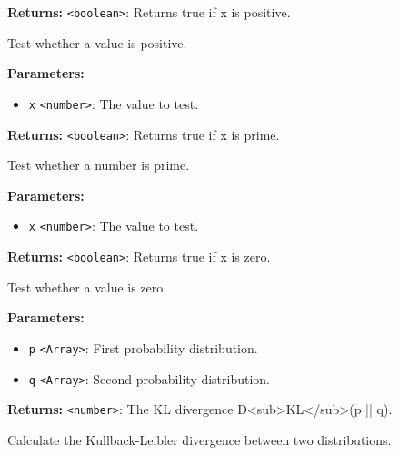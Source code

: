 \documentclass[12pt,a4paper]{article}
\begin{document}
\noindent \textbf{Returns:} \texttt{<boolean>}: Returns true if x is positive.

\noindent Test whether a value is positive.

\vspace{5mm}
\noindent {}


\noindent \textbf{Parameters:}
\begin{itemize}
  \item \texttt{x} \texttt{<number>}: The value to test.
\end{itemize}

\noindent \textbf{Returns:} \texttt{<boolean>}: Returns true if x is prime.

\noindent Test whether a number is prime.

\vspace{5mm}
\noindent {}


\noindent \textbf{Parameters:}
\begin{itemize}
  \item \texttt{x} \texttt{<number>}: The value to test.
\end{itemize}

\noindent \textbf{Returns:} \texttt{<boolean>}: Returns true if x is zero.

\noindent Test whether a value is zero.

\vspace{5mm}
\noindent {}


\noindent \textbf{Parameters:}
\begin{itemize}
  \item \texttt{p} \texttt{<Array>}: First probability distribution.
  \item \texttt{q} \texttt{<Array>}: Second probability distribution.
\end{itemize}

\noindent \textbf{Returns:} \texttt{<number>}: The KL divergence D<sub>KL</sub>(p || q).

\noindent Calculate the Kullback-Leibler divergence between two distributions.

\vspace{5mm}
\noindent {}\vspace{4mm}
\end{document}
